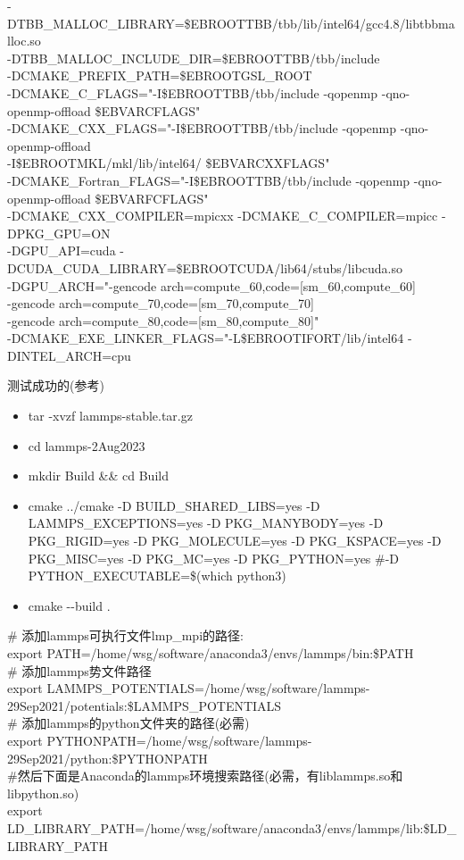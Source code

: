 \documentclass[10pt,a4paper]{article}
\begin{document}
-DTBB\_MALLOC\_LIBRARY=\$EBROOTTBB/tbb/lib/intel64/gcc4.8/libtbbmalloc.so \\
-DTBB\_MALLOC\_INCLUDE\_DIR=\$EBROOTTBB/tbb/include \\
-DCMAKE\_PREFIX\_PATH=\$EBROOTGSL\_ROOT \\
-DCMAKE\_C\_FLAGS="-I\$EBROOTTBB/tbb/include -qopenmp -qno-openmp-offload \$EBVARCFLAGS" \\
-DCMAKE\_CXX\_FLAGS="-I\$EBROOTTBB/tbb/include -qopenmp -qno-openmp-offload \\
-I\$EBROOTMKL/mkl/lib/intel64/ \$EBVARCXXFLAGS" \\
-DCMAKE\_Fortran\_FLAGS="-I\$EBROOTTBB/tbb/include -qopenmp -qno-openmp-offload \$EBVARFCFLAGS" \\
-DCMAKE\_CXX\_COMPILER=mpicxx -DCMAKE\_C\_COMPILER=mpicc -DPKG\_GPU=ON \\
-DGPU\_API=cuda -DCUDA\_CUDA\_LIBRARY=\$EBROOTCUDA/lib64/stubs/libcuda.so \\
-DGPU\_ARCH="-gencode arch=compute\_60,code=[sm\_60,compute\_60] \\
-gencode arch=compute\_70,code=[sm\_70,compute\_70] \\
-gencode arch=compute\_80,code=[sm\_80,compute\_80]" \\
-DCMAKE\_EXE\_LINKER\_FLAGS="-L\$EBROOTIFORT/lib/intel64 -DINTEL\_ARCH=cpu

测试成功的(参考)
\begin{itemize}
	\item \textrm{tar -xvzf lammps-stable.tar.gz}
	\item \textrm{cd lammps-2Aug2023}
	\item \textrm{mkdir Build \&\& cd Build}
	\item \textrm{cmake ../cmake -D BUILD\_SHARED\_LIBS=yes -D LAMMPS\_EXCEPTIONS=yes  -D PKG\_MANYBODY=yes -D PKG\_RIGID=yes -D PKG\_MOLECULE=yes -D PKG\_KSPACE=yes -D PKG\_MISC=yes -D PKG\_MC=yes  -D PKG\_PYTHON=yes \#-D PYTHON\_EXECUTABLE=\$(which python3)}
	\item \textrm{cmake -\/-build .}
\end{itemize}

\# 添加\textrm{lammps}可执行文件\textrm{lmp_mpi}的路径:\\
\textrm{export PATH=/home/wsg/software/anaconda3/envs/lammps/bin:\$PATH}\\
\# 添加\textrm{lammps}势文件路径\\
\textrm{export LAMMPS\_POTENTIALS=/home/wsg/software/lammps-29Sep2021/potentials:\$LAMMPS\_POTENTIALS}\\
\# 添加\textrm{lammps}的\textrm{python}文件夹的路径(必需)\\
\textrm{export PYTHONPATH=/home/wsg/software/lammps-29Sep2021/python:\$PYTHONPATH}\\
\#然后下面是\textrm{Anaconda}的\textrm{lammps}环境搜索路径(必需，有\textrm{liblammps.so}和\textrm{libpython.so})\\
\textrm{export LD\_LIBRARY\_PATH=/home/wsg/software/anaconda3/envs/lammps/lib:\$LD\_LIBRARY\_PATH}
\end{document}
